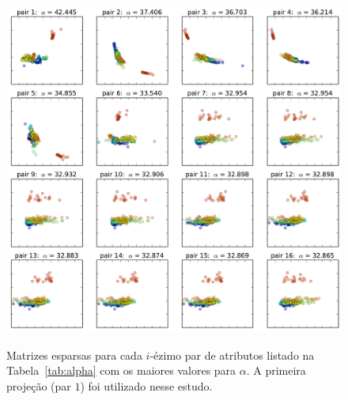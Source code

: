 \begin{figure}[h!]
\begin{center}
{    \centering
        \includegraphics[width=\columnwidth]{figs/sm_pintores}}
      \caption{Matrizes esparsas para cada $i$-ézimo par de atributos listado na
        Tabela~\ref{tab:alpha} com os maiores valores para $\alpha$. A primeira
        projeção (par $1$) foi utilizado nesse estudo.}
        \label{fig:scatters}
        \end{center}
\end{figure}


